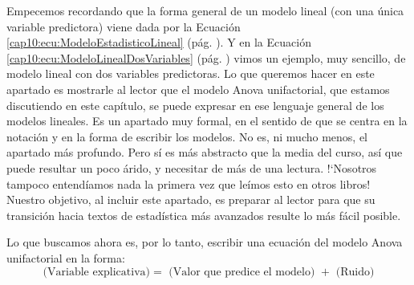 Empecemos recordando que la forma general de un modelo lineal (con una única variable predictora) viene dada por la Ecuación \ref{cap10:ecu:ModeloEstadisticoLineal} (pág. \pageref{cap10:ecu:ModeloEstadisticoLineal}).  Y en la Ecuación \ref{cap10:ecu:ModeloLinealDosVariables} (pág. \pageref{cap10:ecu:ModeloLinealDosVariables}) vimos un ejemplo, muy sencillo, de modelo lineal con dos variables predictoras. Lo que queremos hacer en este apartado es mostrarle al lector que el modelo Anova unifactorial, que estamos discutiendo en este capítulo, se puede expresar en ese lenguaje general de los modelos lineales. Es un apartado muy formal, en el sentido de que se centra en la notación y en la forma de escribir los modelos. No es, ni mucho menos, el apartado más profundo. Pero sí es más abstracto que la media del curso, así que puede resultar un poco árido, y necesitar de más de una lectura. {!`}Nosotros tampoco entendíamos nada la primera vez que leímos esto en otros libros! Nuestro objetivo, al incluir este apartado, es preparar al lector para que su transición hacia textos de estadística más avanzados resulte lo más fácil posible.

Lo que buscamos ahora es, por lo tanto, escribir una ecuación del modelo Anova unifactorial en la forma:
\begin{equation}
\label{cap11:ecu:VarRespuestaIgualModeloMasRuido}
\mbox{ (Variable explicativa)} =
\mbox{ (Valor que predice el modelo) }
+
\mbox{ (Ruido) }
\end{equation}

